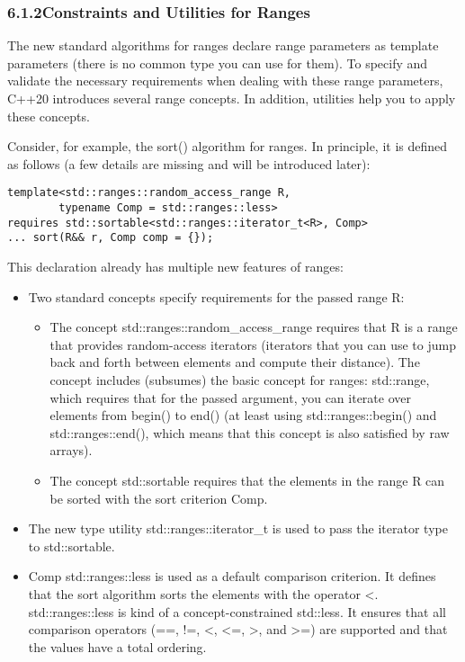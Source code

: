 \subsubsection*{ 6.1.2\hspace{0.2cm}Constraints and Utilities for Ranges}

The new standard algorithms for ranges declare range parameters as template parameters (there is no common type you can use for them). To specify and validate the necessary requirements when dealing with these range parameters, C++20 introduces several range concepts. In addition, utilities help you to apply these concepts.

Consider, for example, the sort() algorithm for ranges. In principle, it is defined as follows (a few details are missing and will be introduced later):

\begin{lstlisting}[style=styleCXX]
template<std::ranges::random_access_range R,
		typename Comp = std::ranges::less>
requires std::sortable<std::ranges::iterator_t<R>, Comp>
... sort(R&& r, Comp comp = {});
\end{lstlisting}

This declaration already has multiple new features of ranges:

\begin{itemize}
\item
Two standard concepts specify requirements for the passed range R:

\begin{itemize}
\item
The concept std::ranges::random\_access\_range requires that R is a range that provides random-access iterators (iterators that you can use to jump back and forth between elements and compute their distance). The concept includes (subsumes) the basic concept for ranges: std::range, which requires that for the passed argument, you can iterate over elements from begin() to end() (at least using std::ranges::begin() and std::ranges::end(), which means that this concept is also satisfied by raw arrays).

\item
The concept std::sortable requires that the elements in the range R can be sorted with the sort criterion Comp.
\end{itemize}

\item
The new type utility std::ranges::iterator\_t is used to pass the iterator type to std::sortable.

\item
Comp std::ranges::less is used as a default comparison criterion. It defines that the sort algorithm sorts the elements with the operator <. std::ranges::less is kind of a concept-constrained std::less. It ensures that all comparison operators (==, !=, <, <=, >, and >=) are supported and that the values have a total ordering.
\end{itemize}


